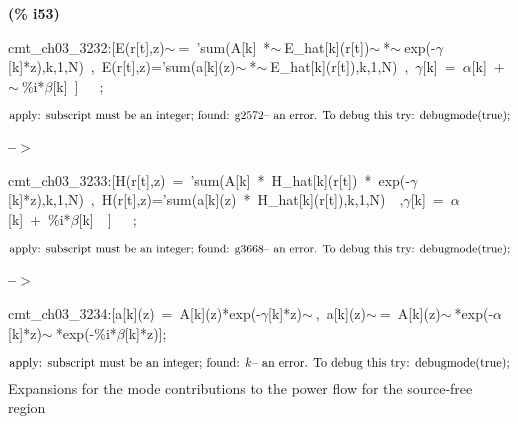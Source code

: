 \documentclass[fleqn]{article}
\begin{document}
\noindent
\begin{minipage}[t]{4.000000em}\color{red}\bfseries
(\% i53)	
\end{minipage}
\begin{minipage}[t]{\textwidth}\color{blue}
cmt\_ch03\_3232:[E(r[t],z)\ensuremath{\sim\ }=\ 'sum(A[k]\ *\ensuremath{\sim\ }E\_hat[k](r[t])\ensuremath{\sim\ }*\ensuremath{\sim\ }exp(-\ensuremath{\gamma}[k]*z),k,1,N)\ ,\ E(r[t],z)='sum(a[k](z)\ensuremath{\sim\ }*\ensuremath{\sim\ }E\_hat[k](r[t]),k,1,N)\ ,\ \ensuremath{\gamma}[k]\ =\ \ensuremath{\alpha}[k]\ +\ensuremath{\sim\ }\%i*\ensuremath{\beta}[k]\ ]\ \ \ ;
\end{minipage}
\[\displaystyle \mbox{}\\\mbox{%
apply: subscript must be an integer; found: }\ensuremath{\mathrm{g2572
}}\mbox{%
 -- an error. To debug this try: debugmode(true);}\mbox{}
\]


\noindent
\begin{minipage}[t]{4.000000em}\color{red}\bfseries
 --\ensuremath{\ensuremath{>}}	
\end{minipage}
\begin{minipage}[t]{\textwidth}\color{blue}
cmt\_ch03\_3233:[H(r[t],z)\ =\ 'sum(A[k]\ *\ H\_hat[k](r[t])\ *\ exp(-\ensuremath{\gamma}[k]*z),k,1,N)\ ,\ H(r[t],z)='sum(a[k](z)\ *\ H\_hat[k](r[t]),k,1,N)\ \ ,\ensuremath{\gamma}[k]\ =\ \ensuremath{\alpha}[k]\ +\ \%i*\ensuremath{\beta}[k]\ \ ]\ \ \ ;
\end{minipage}
\[\displaystyle \mbox{}\\\mbox{%
apply: subscript must be an integer; found: }\ensuremath{\mathrm{g3668
}}\mbox{%
 -- an error. To debug this try: debugmode(true);}\mbox{}
\]


\noindent
\begin{minipage}[t]{4.000000em}\color{red}\bfseries
 --\ensuremath{\ensuremath{>}}	
\end{minipage}
\begin{minipage}[t]{\textwidth}\color{blue}
cmt\_ch03\_3234:[a[k](z)\ =\ A[k](z)*exp(-\ensuremath{\gamma}[k]*z)\ensuremath{\sim\ },\ a[k](z)\ensuremath{\sim\ }=\ A[k](z)\ensuremath{\sim\ }*exp(-\ensuremath{\alpha}[k]*z)\ensuremath{\sim\ }*exp(-\%i*\ensuremath{\beta}[k]*z)];
\end{minipage}
\[\displaystyle \mbox{}\\\mbox{%
apply: subscript must be an integer; found: }k
\mbox{%
 -- an error. To debug this try: debugmode(true);}\mbox{}
\]
Expansions for the mode contributions to the power flow for the source-free region
\end{document}
